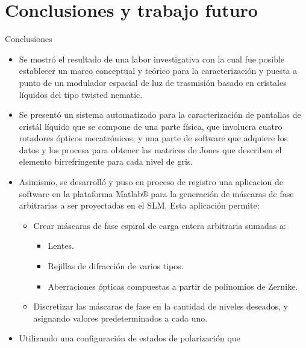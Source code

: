 \documentclass[xcolor=table,serif]{beamer}
\begin{document}
\section{Conclusiones y trabajo futuro}	
	\begin{frame}{Conclusiones}
	\begin{itemize}
\item Se mostró el resultado de una labor investigativa con la cual
  fue posible establecer un marco conceptual y teórico para la
  caracterización y puesta a punto de un modulador espacial de luz de
  trasmisión basado en cristales líquidos del tipo twisted nematic. 
\item Se presentó un sistema automatizado para la caracterización de
  pantallas de cristál líquido que se compone de una parte física, que
  involucra cuatro rotadores ópticos mecatrónicos, y una parte de
  software que adquiere los datos y los procesa para obtener las
  matrices de Jones que describen el elemento birrefringente para cada
  nivel de gris. 
\item Asimismo, se desarrolló y puso en proceso de registro una aplicacion de software en la
  plataforma Matlab$\circledR$ para la
  generación de máscaras de fase arbitrarias a ser proyectadas en el
  SLM. Esta aplicación permite:
  \begin{itemize}
    \item Crear máscaras de fase espiral de carga entera arbitraria
      sumadas a:
      \begin{itemize}
        \item Lentes.
        \item Rejillas de difracción de varios tipos.
        \item Aberraciones ópticas compuestas a partir de polinomios
          de Zernike.
      \end{itemize}
    \item Discretizar las máscaras de fase en la cantidad de niveles
      deseados, y asignando valores predeterminados a cada uno. 
  \end{itemize}
 \item Utilizando una configuración de estados de polarización que

\end{itemize}
\end{frame}
\end{document}
